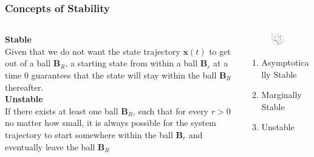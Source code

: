 \documentclass[11pt,handout]{beamer}   %
\begin{document}
\begin{frame}
\frametitle{Concepts of Stability}
\small
\begin{columns}
\begin{column}{0.5\textwidth}
\textbf{Stable}\\
Given that we do not want the state trajectory $\mathbf{x}(t)$ to get out of a ball $\mathbf{B}_R$, a starting state from within a ball $\mathbf{B}_r$ at a time 0 guarantees that the state will stay within the ball $\mathbf{B}_R$ thereafter.\\
\vspace{6pt}
\textbf{Unstable}\\
If there exists at least one ball $\mathbf{B}_R$, such that for every $r>0$ no matter how small, it is always possible for the system trajectory to start somewhere within the ball $\mathbf{B}_r$ and eventually leave the ball $\mathbf{B}_R$
\end{column}
\begin{column}{0.5\textwidth}
\begin{figure}
\includegraphics[width = 0.8\textwidth]{Figures/Fig33.PNG}
\end{figure}
\begin{enumerate}
\item Asymptotically Stable
\item Marginally Stable
\item Unstable
\end{enumerate}
\end{column}
\end{columns}
\end{frame}
\end{document}

